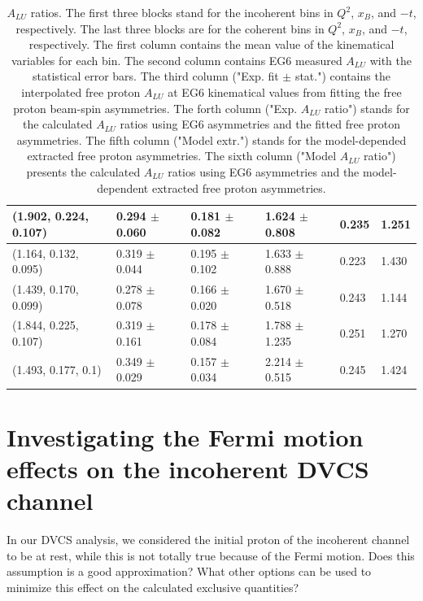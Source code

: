 \begin{landscape}
\begin{table}[!h]
\begin{center}
\begin{tabular}{||l|l|l|l|l|l||}
 (1.902, 0.224, 0.107) & 0.294 $\pm$ 0.060 & 0.181 $\pm$ 0.082 & 1.624 $\pm$ 0.808 & 0.235 & 1.251 \\
     \hline \hline  \hline                                                                   
 (1.164, 0.132, 0.095) & 0.319 $\pm$ 0.044 & 0.195 $\pm$ 0.102 & 1.633 $\pm$ 0.888 & 0.223 & 1.430 \\
 (1.439, 0.170, 0.099) & 0.278 $\pm$ 0.078 & 0.166 $\pm$ 0.020 & 1.670 $\pm$ 0.518 & 0.243 & 1.144 \\
 (1.844, 0.225, 0.107) & 0.319 $\pm$ 0.161 & 0.178 $\pm$ 0.084 & 1.788 $\pm$ 1.235 & 0.251 & 1.270 \\
      \hline  \hline  \hline                                                                 
 (1.493, 0.177, 0.1)   & 0.349 $\pm$ 0.029 & 0.157 $\pm$ 0.034 & 2.214 $\pm$ 0.515 & 0.245 & 1.424 \\                                                               
 \hline
 \end{tabular}
 \caption{$A_{LU}$ ratios. The first three blocks stand for the incoherent bins 
 in $Q^{2}$, $x_{B}$, and $-t$, respectively. The last three blocks are for the 
 coherent bins in $Q^{2}$, $x_{B}$, and $-t$, respectively. The first column 
 contains the mean value of the kinematical variables for each bin. The second 
 column contains EG6 measured $A_{LU}$ with the statistical error bars. The 
 third column ("Exp. fit $\pm$ stat.") contains the interpolated free proton 
 $A_{LU}$ at EG6 kinematical values from fitting the free proton beam-spin 
 asymmetries. The forth column ("Exp. $A_{LU}$ ratio") stands for the 
 calculated $A_{LU}$ ratios using EG6 asymmetries and the fitted free proton 
 asymmetries. The fifth column ("Model extr.") stands for the model-depended 
 extracted free proton asymmetries. The sixth column ("Model $A_{LU}$ ratio") 
 presents the calculated $A_{LU}$ ratios using EG6 asymmetries and the 
 model-dependent extracted free proton asymmetries. }
 \label{table:ALU_ratios_}
 \end{center}
\end{table}
\end{landscape}

\chapter{Investigating the Fermi motion effects on the incoherent DVCS channel}

In our DVCS analysis, we considered the initial proton of the incoherent 
channel to be at rest, while this is not totally true because of the Fermi 
motion. Does this assumption is a good approximation? What other options can be 
used to minimize this effect on the calculated exclusive quantities?\\

